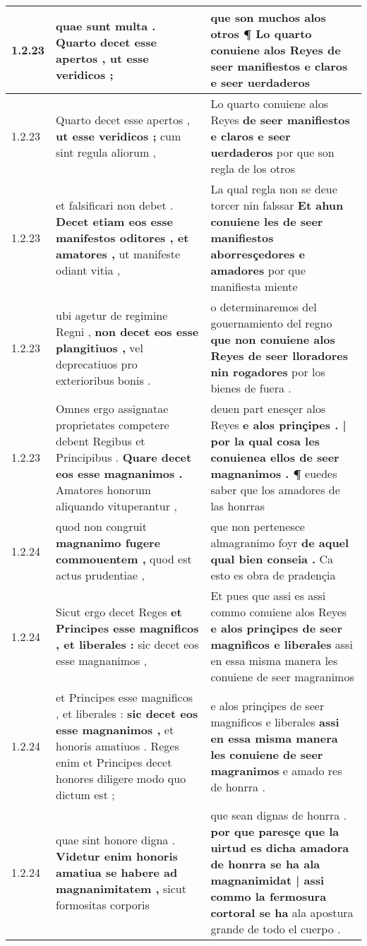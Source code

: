 \begin{tabular}{|p{1cm}|p{6.5cm}|p{6.5cm}|}
1.2.23 & quae sunt multa . \textbf{ Quarto decet esse apertos , } ut esse veridicos ; & que son muchos alos otros ¶ \textbf{ Lo quarto conuiene alos Reyes } de seer manifiestos e claros e seer uerdaderos \\\hline
1.2.23 & Quarto decet esse apertos , \textbf{ ut esse veridicos ; } cum sint regula aliorum , & Lo quarto conuiene alos Reyes \textbf{ de seer manifiestos e claros e seer uerdaderos } por que son regla de los otros \\\hline
1.2.23 & et falsificari non debet . \textbf{ Decet etiam eos esse manifestos oditores , et amatores , } ut manifeste odiant vitia , & La qual regla non se deue torcer nin falssar \textbf{ Et ahun conuiene les de seer manifiestos aborresçedores e amadores } por que manifiesta miente \\\hline
1.2.23 & ubi agetur de regimine Regni , \textbf{ non decet eos esse plangitiuos , } vel deprecatiuos pro exterioribus bonis . & o determinaremos del gouernamiento del regno \textbf{ que non conuiene alos Reyes de seer lloradores nin rogadores } por los bienes de fuera . \\\hline
1.2.23 & Omnes ergo assignatae proprietates competere debent Regibus et Principibus . \textbf{ Quare decet eos esse magnanimos . } Amatores honorum aliquando vituperantur , & deuen part enesçer alos Reyes \textbf{ e alos prinçipes . | por la qual cosa les conuienea ellos de seer magnanimos . ¶ } euedes saber que los amadores de las honrras \\\hline
1.2.24 & quod non congruit \textbf{ magnanimo fugere commouentem , } quod est actus prudentiae , & que non pertenesce almagranimo foyr \textbf{ de aquel qual bien conseia . } Ca esto es obra de pradençia \\\hline
1.2.24 & Sicut ergo decet Reges \textbf{ et Principes esse magnificos , et liberales : } sic decet eos esse magnanimos , & Et pues que assi es assi commo conuiene alos Reyes \textbf{ e alos prinçipes de seer magnificos e liberales } assi en essa misma manera les conuiene de seer magranimos \\\hline
1.2.24 & et Principes esse magnificos , et liberales : \textbf{ sic decet eos esse magnanimos , } et honoris amatiuos . Reges enim et Principes decet honores diligere modo quo dictum est ; & e alos prinçipes de seer magnificos e liberales \textbf{ assi en essa misma manera les conuiene de seer magranimos } e amado res de honrra . \\\hline
1.2.24 & quae sint honore digna . \textbf{ Videtur enim honoris amatiua se habere ad magnanimitatem , } sicut formositas corporis & que sean dignas de honrra . \textbf{ por que paresçe que la uirtud es dicha amadora de honrra se ha ala magnanimidat | assi commo la fermosura cortoral se ha } ala apostura grande de todo el cuerpo . \\\hline

\end{tabular}
